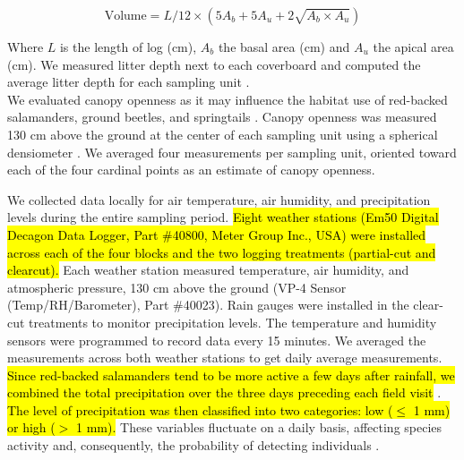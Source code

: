 \begin{equation}
  \text{Volume} = L/12 \times (5A_b + 5A_u + 2\sqrt{A_b \times A_u})
\end{equation}

\vspace{0.5cm}

Where $L$ is the length of log (cm), $A_b$ the basal area (cm) and $A_u$ the apical area (cm).
We measured litter depth next to each coverboard and computed the average litter depth for each sampling unit \citep{Mazerolle2021Woodlandsalamander}. \\
We evaluated canopy openness as it may influence the habitat use of red-backed salamanders, ground beetles, and springtails \citep{messereForestFloorDistribution1998,koivulaBorealCarabidbeetleColeoptera2002a,tilghmanMetaanalysisEffectsCanopy2012,henneronForestPlantCommunity2017}.
Canopy openness was measured 130 cm above the ground at the center of each sampling unit using a spherical densiometer \citep{lemmonSphericalDensiometerEstimating1956}. 
We averaged four measurements per sampling unit, oriented toward each of the four cardinal points as an estimate of canopy openness.

We collected data locally for air temperature, air humidity, and precipitation levels during the entire sampling period. 
\hl{Eight weather stations (Em50 Digital Decagon Data Logger, Part \#40800, Meter Group Inc., USA) were installed across each of the four blocks and the two logging treatments (partial-cut and clearcut). }
Each weather station measured temperature, air humidity, and atmospheric pressure, 130 cm above the ground (VP-4 Sensor (Temp/RH/Barometer), Part \#40023). 
Rain gauges were installed in the clear-cut treatments to monitor precipitation levels. 
The temperature and humidity sensors were programmed to record data every 15 minutes. 
We averaged the measurements across both weather stations to get daily average measurements. 
\hl{Since red-backed salamanders tend to be more active a few days after rainfall, we combined the total precipitation over the three days preceding each field visit} \citep{odonnellPredictingVariationMicrohabitat2014a}. 
\hl{The level of precipitation was then classified into two categories: low ($\leq$ 1 mm) or high ($>$ 1 mm). }
These variables fluctuate on a daily basis, affecting species activity and, consequently, the probability of detecting individuals \citep{spotilaRoleTemperatureWater1972,butterfieldCarabidLifeCycle1996,loveiEcologyBehaviorGround1996,odonnellPredictingVariationMicrohabitat2014a}.


